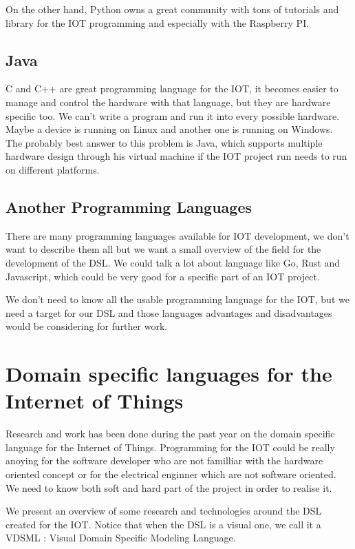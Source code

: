 On the other hand, Python owns a great community with tons of tutorials and library
for the IOT programming and especially with the Raspberry PI.

\subsection{Java}
\label{subsec:java}

C and C++ are great programming language for the IOT, it becomes easier to manage
and control the hardware with that language, but they are hardware specific
too. We can’t write a program and run it into every possible hardware. Maybe a
device is running on Linux and another one is running on Windows. The probably
best answer to this problem is Java\cite{Waher:2015:LIT:2789499}, which supports
multiple hardware design through his virtual machine if the IOT project run
needs to run on different platforms.

\subsection{Another Programming Languages}
\label{subsec:other-prog-lang}

There are many programming languages available for IOT development, we don’t want
to describe them all but we want a small overview of the field for the
development of the DSL. We could talk a lot about language like Go, Rust and
Javascript, which could be very good for a specific part of an IOT project.

We don’t need to know all the usable programming language for the IOT, but we
need a target for our DSL and those languages advantages and disadvantages
would be considering for further work.

\section{Domain specific languages for the Internet of Things}
\label{sec:dsl_for_iot}

Research and work has been done during the past year on the domain specific
language for the Internet of Things. Programming for the IOT could be really
anoying for the software developer who are not familliar with the hardware oriented
concept or for the electrical enginner which are not software oriented. We need
to know both soft and hard part of the project in order to realise it.

We present an overview of some research and technologies around the DSL created
for the IOT. Notice that when the DSL is a visual one, we call it a VDSML :
Visual Domain Specific Modeling Language.

